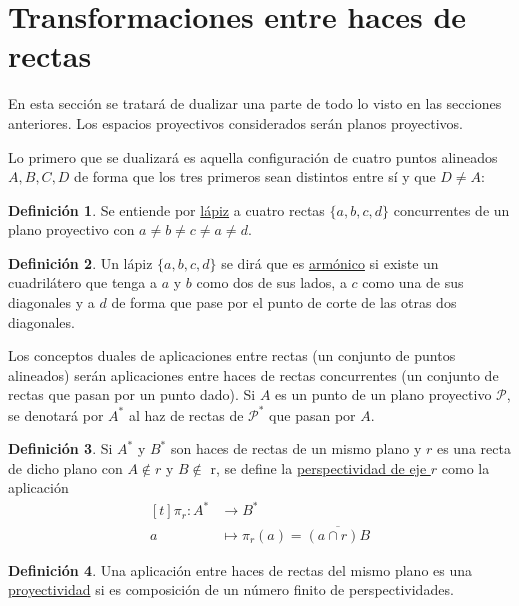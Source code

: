 \documentclass[12pt]{report}
\theoremstyle{definition}
\newtheorem{definition}{Definición}[chapter]
\theoremstyle{definition}
\theoremstyle{remark}
\begin{document}
\section{Transformaciones entre haces de rectas}

En esta sección se tratará de dualizar una parte de todo lo visto en las secciones anteriores. Los espacios proyectivos considerados serán planos proyectivos.

\vspace{2mm}
Lo primero que se dualizará es aquella configuración de cuatro puntos alineados $A,B,C,D$ de forma que los tres primeros sean distintos entre sí y que $D \neq A$:

\begin{definition}
Se entiende por \ul{lápiz} a cuatro rectas $\{a,b,c,d\}$ concurrentes de un plano proyectivo con $a \neq b \neq c \neq a \neq d$.
\end{definition}

\begin{definition}
Un lápiz $\{a,b,c,d\}$ se dirá que es \ul{armónico} si existe un cuadrilátero que tenga a $a$ y $b$ como dos de sus lados, a $c$ como una de sus diagonales y a $d$ de forma que pase por el punto de corte de las otras dos diagonales.
\end{definition}

Los conceptos duales de aplicaciones entre rectas (un conjunto de puntos alineados) serán aplicaciones entre haces de rectas concurrentes (un conjunto de rectas que pasan por un punto dado). Si $A$ es un punto de un plano proyectivo $\mathcal{P}$, se denotará por $A^*$ al haz de rectas de $\mathcal{P^*}$ que pasan por $A$.

\begin{definition}
Si $A^*$ y $B^*$ son haces de rectas de un mismo plano y $r$ es una recta de dicho plano con $A \notin r$ y $B \notin$ r, se define la \ul{perspectividad de eje $r$} como la aplicación
\[
\begin{aligned}[t]
\pi_r \colon A^* &\longrightarrow B^* \\
a &\longmapsto \pi_r(a) = \overline{(a \cap r)B}
\end{aligned}
\]
\end{definition}

\begin{definition}
Una aplicación entre haces de rectas del mismo plano es una \ul{proyectividad} si es composición de un número finito de perspectividades.
\end{definition}
\end{document}
